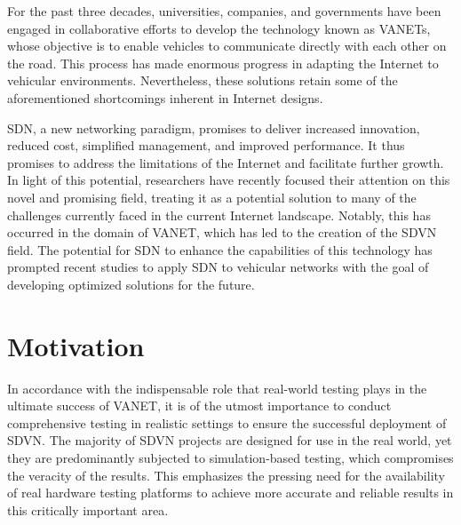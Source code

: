 For the past three decades, universities, companies, and governments have been engaged in collaborative efforts to develop the technology known as VANETs, whose objective is to enable vehicles to communicate directly with each other on the road.
This process has made enormous progress in adapting the Internet to vehicular environments. Nevertheless, these solutions retain some of the aforementioned shortcomings inherent in Internet designs.

SDN, a new networking paradigm, promises to deliver increased innovation, reduced cost, simplified management, and improved performance.
It thus promises to address the limitations of the Internet and facilitate further growth. In light of this potential, researchers have recently focused their attention on this novel and promising field, treating it as a potential solution to many of the challenges currently faced in the current Internet landscape.
Notably, this has occurred in the domain of VANET, which has led to the creation of the SDVN field. The potential for SDN to enhance the capabilities of this technology has prompted recent studies to apply SDN to vehicular networks with the goal of developing optimized solutions for the future.


\section{Motivation} %
\label{sec:motivation}


In accordance with the indispensable role that real-world testing plays in the ultimate success of VANET, it is of the utmost importance to conduct comprehensive testing in realistic settings to ensure the successful deployment of SDVN. The majority of SDVN projects are designed for use in the real world, yet they are predominantly subjected to simulation-based testing, which compromises the veracity of the results. This emphasizes the pressing need for the availability of real hardware testing platforms to achieve more accurate and reliable results in this critically important area. 

